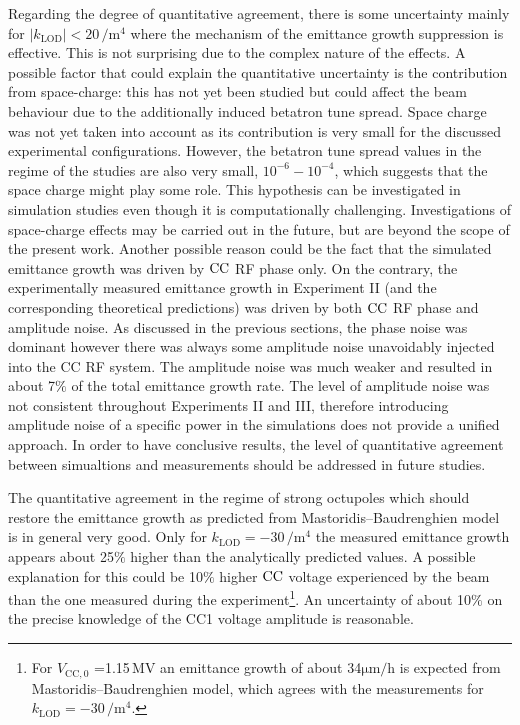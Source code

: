 Regarding the degree of quantitative agreement, there is some uncertainty mainly for $| k_\mathrm{LOD}| < 20$\,$\mathrm{/m^4}$ where the mechanism of the emittance growth suppression is effective. This is not surprising due to the complex nature of the effects. A possible factor that could explain the quantitative uncertainty is the contribution from space-charge: this has not yet been studied but could affect the beam behaviour due to the additionally induced betatron tune spread. Space charge was not yet taken into account as its contribution is very small for the discussed experimental configurations. However, the betatron tune spread values in the regime of the studies are also very small, $10^{-6}-10^{-4}$, which suggests that the space charge might play some role. This hypothesis can be investigated in simulation studies even though it is computationally challenging. Investigations of space-charge effects may be carried out in the future, but are beyond the scope of the present work. Another possible reason could be the fact that the simulated emittance growth was driven by ${\mathrm{CC}}$ RF phase only. On the contrary, the experimentally measured emittance growth in Experiment II (and the corresponding theoretical predictions) was driven by both ${\mathrm{CC}}$ RF phase and amplitude noise. As discussed in the previous sections, the phase noise was dominant however there was always some amplitude noise unavoidably injected into the CC RF system. The amplitude noise was much weaker and resulted in about 7$\%$ of the total emittance growth rate. The level of amplitude noise was not consistent throughout Experiments II and III, therefore introducing amplitude noise of a specific power in the simulations does not provide a unified approach. In order to have conclusive results, the level of quantitative agreement between simualtions and measurements should be addressed in future studies.

The quantitative agreement in the regime of strong octupoles which should restore the emittance growth as predicted from Mastoridis--Baudrenghien model is in general very good. Only for $k_\mathrm{LOD} =-30$\,$\mathrm{/m^4}$ the measured emittance growth appears about 25$\%$ higher than the analytically predicted values. A possible explanation for this could be 10$\%$ higher ${\mathrm{CC}}$ voltage experienced by the beam than the one measured during the experiment\footnote{For $V_\mathrm{CC,0}$ =1.15\,MV an emittance growth of about 34$\mathrm{\mu m/h}$ is expected from Mastoridis--Baudrenghien model, which agrees with the measurements for $k_\mathrm{LOD} =-30$\,$\mathrm{/m^4}$.}. An uncertainty of about 10$\%$ on the precise knowledge of the CC1 voltage amplitude is reasonable. 


